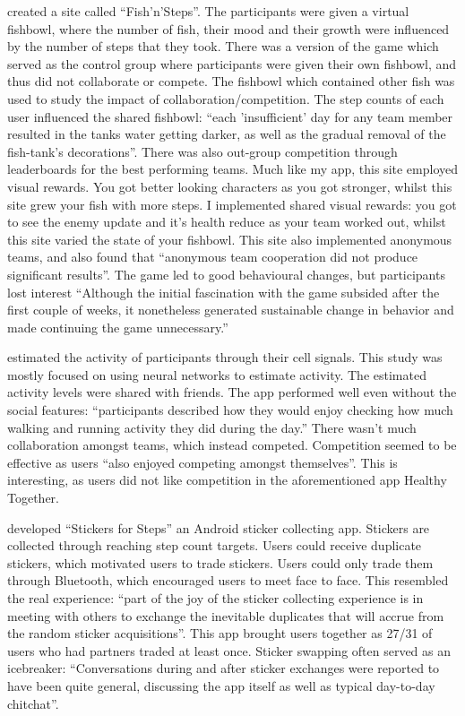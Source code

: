 \documentclass{l4proj}
\begin{document}
\citet{Fish'n'Steps} created a site called ``Fish'n'Steps''. The participants were given a virtual fishbowl, where the number of fish, their mood and their growth were influenced by the number of steps that they took. There was a version of the game which served as the control group where participants were given their own fishbowl, and thus did not collaborate or compete. The fishbowl which contained other fish was used to study the impact of collaboration/competition. The step counts of each user influenced the shared fishbowl: ``each 'insufficient' day for any team member resulted in the tanks water getting darker, as well as the gradual removal of the fish-tank’s decorations''. There was also out-group competition through leaderboards for the best performing teams. Much like my app, this site employed visual rewards. You got better looking characters as you got stronger, whilst this site grew your fish with more steps. I implemented shared visual rewards: you got to see the enemy update and it's health reduce as your team worked out, whilst this site varied the state of your fishbowl. This site also implemented anonymous teams, and also found that ``anonymous team cooperation did not produce significant results''.  The game led to good behavioural changes, but participants lost interest ``Although the initial fascination with the game subsided after the first couple of weeks, it nonetheless generated sustainable change in behavior and made continuing the game unnecessary.''

\citet{Shakra} estimated the activity of participants through their cell signals. This study was mostly focused on using neural networks to estimate activity. The estimated activity levels were shared with friends. The app performed well even without the social features: ``participants described how they would enjoy checking how much walking and running activity they did during the day.'' There wasn't much collaboration amongst teams, which instead competed. Competition seemed to be effective as users ``also enjoyed competing amongst themselves''. This is interesting, as users did not like competition in the aforementioned app Healthy Together. 

\citet{Stickers} developed ``Stickers for Steps'' an Android sticker collecting app. Stickers are collected through reaching step count targets. Users could receive duplicate stickers, which motivated users to trade stickers. Users could only trade them through Bluetooth, which encouraged users to meet face to face. This resembled the real experience: ``part of the joy of the sticker collecting experience is in meeting with others to exchange the inevitable duplicates that will accrue from the random sticker acquisitions''. This app brought users together as 27/31 of users who had partners traded at least once. Sticker swapping often served as an icebreaker: ``Conversations during and after sticker exchanges were reported to have been quite general, discussing the app itself as well as typical day-to-day chitchat''.
\end{document}
